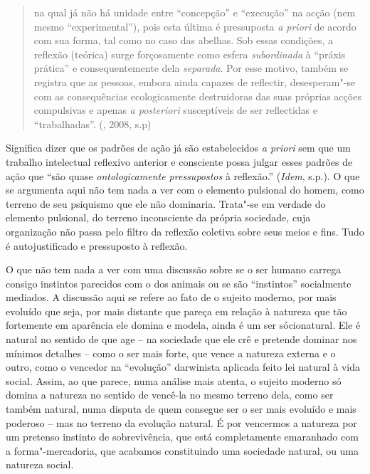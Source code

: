 {\begin{quote}
na qual já não há unidade entre ``concepção'' e ``execução'' na acção
(nem mesmo ``experimental''), pois esta última é pressuposta \emph{a
priori} de acordo com sua forma, tal como no caso das abelhas. Sob essas
condições, a reflexão (teórica) surge forçosamente como esfera
\emph{subordinada} à ``práxis prática'' e consequentemente dela
\emph{separada}. Por esse motivo, também se registra que as pessoas,
embora ainda capazes de reflectir, desesperam"-se com as consequências
ecologicamente destruidoras das suas próprias acções compulsivas e
apenas \emph{a posteriori} susceptíveis de ser reflectidas e
``trabalhadas''. (, 2008, s.p)
\end{quote}

Significa dizer que os padrões de ação já são estabelecidos \emph{a
priori} sem que um trabalho intelectual reflexivo anterior e consciente
possa julgar esses padrões de ação que ``são quase \emph{ontologicamente
pressupostos} à reflexão.'' (\emph{Idem}, s.p.). O que se argumenta aqui
não tem nada a ver com o elemento pulsional do homem, como terreno de
seu psiquismo que ele não dominaria. Trata"-se em verdade do elemento
pulsional, do terreno inconsciente da própria sociedade, cuja
organização não passa pelo filtro da reflexão coletiva sobre seus meios
e fins. Tudo é autojustificado e pressuposto à reflexão.

O que não tem nada a ver com uma discussão sobre se o ser humano carrega
consigo instintos parecidos com o dos animais ou se são ``instintos''
socialmente mediados. A discussão aqui se refere ao fato de o sujeito
moderno, por mais evoluído que seja, por mais distante que pareça em
relação à natureza que tão fortemente em aparência ele domina e modela,
ainda é um ser sócionatural. Ele é natural no sentido de que age -- na
sociedade que ele crê e pretende dominar nos mínimos detalhes -- como o
ser mais forte, que vence a natureza externa e o outro, como o vencedor
na ``evolução'' darwinista aplicada feito lei natural à vida social.
Assim, ao que parece, numa análise mais atenta, o sujeito moderno só
domina a natureza no sentido de vencê-la no mesmo terreno dela, como ser
também natural, numa disputa de quem consegue ser o ser mais evoluído e
mais poderoso -- mas no terreno da evolução natural. É por vencermos a
natureza por um pretenso instinto de sobrevivência, que está
completamente emaranhado com a forma"-mercadoria, que acabamos
constituindo uma sociedade natural, ou uma natureza social.

}
